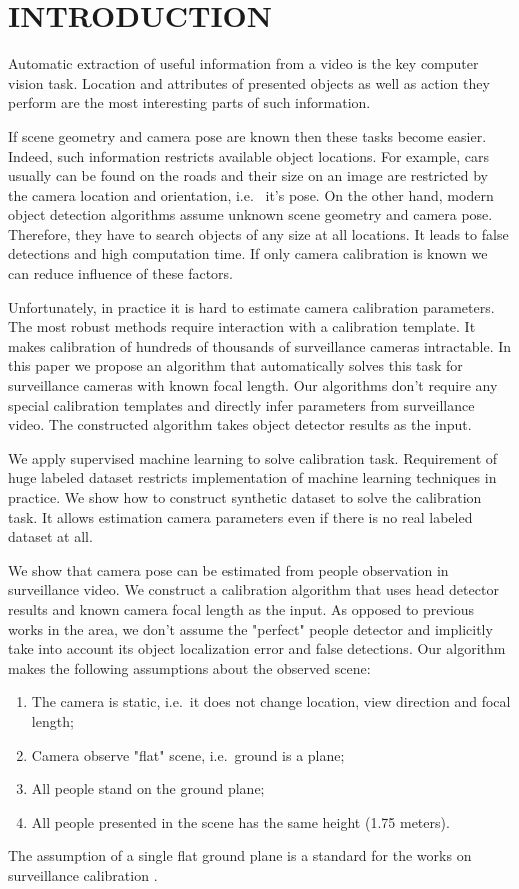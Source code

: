 \section{\uppercase{Introduction}}
\label{sec:introduction}

\noindent Automatic extraction of useful information from a video is the key computer vision task. Location and attributes of presented objects as well as action they perform are the most interesting parts of such information.

If scene geometry and camera pose are known then these tasks become easier. Indeed, such information restricts available object locations. For example, cars usually can be found on the roads and their size on an image are restricted by the camera location and orientation, i.e.~ it's pose. On the other hand, modern object detection algorithms assume unknown scene geometry and camera pose. Therefore, they have to search objects of any size at all locations. It leads to false detections and high computation time. If only camera calibration is known we can reduce influence of these factors.

Unfortunately, in practice it is hard to estimate camera calibration parameters. The most robust methods require interaction with a calibration template. It makes calibration of hundreds of thousands of surveillance cameras intractable. In this paper we propose an algorithm that automatically solves this task for surveillance cameras with known focal length. Our algorithms don't require any special calibration templates and directly infer parameters from surveillance video. The constructed algorithm takes object detector results as the input.

We apply supervised machine learning to solve calibration task. Requirement of huge labeled dataset restricts implementation of machine learning techniques in practice. We show how to construct synthetic dataset to solve the calibration task. It allows estimation camera parameters even if there is no real labeled dataset at all.

We show that camera pose can be estimated from people observation in surveillance video. We construct a calibration algorithm that uses head detector results and known camera focal length as the input. As opposed to previous works in the area, we don't assume the "perfect" people detector and implicitly take into account its object localization error and false detections. Our algorithm makes the following assumptions about the observed scene:
\begin{enumerate}
	\item The camera is static, i.e.\ it does not change location, view direction and focal length;
	\item Camera observe "flat" scene, i.e.\ ground is a plane;
	\item All people stand on the ground plane;
	\item All people presented in the scene has the same height (1.75 meters).
\end{enumerate}
The assumption of a single flat ground plane is a standard for the works on surveillance calibration \cite{liu2011surveillance,chen2007accurate,dubska2014automatic,den2015automatic,micusik2010simultaneous}.

